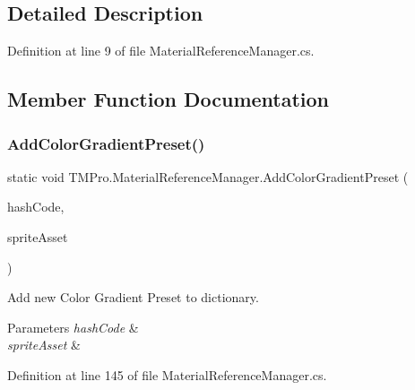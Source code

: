 \subsection{Detailed Description}


Definition at line 9 of file Material\+Reference\+Manager.\+cs.



\subsection{Member Function Documentation}
\mbox{\label{class_t_m_pro_1_1_material_reference_manager_aaff4d63fa8a94aa0b4badb98076ce0b3}} 
\subsubsection{\texorpdfstring{AddColorGradientPreset()}{AddColorGradientPreset()}}
{\footnotesize\ttfamily static void T\+M\+Pro.\+Material\+Reference\+Manager.\+Add\+Color\+Gradient\+Preset (\begin{DoxyParamCaption}\item[{int}]{hash\+Code,  }\item[{\mbox{\hyperlink{class_t_m_pro_1_1_t_m_p___color_gradient}{T\+M\+P\+\_\+\+Color\+Gradient}}}]{sprite\+Asset }\end{DoxyParamCaption})\hspace{0.3cm}{\ttfamily [static]}}



Add new Color Gradient Preset to dictionary. 


\begin{DoxyParams}{Parameters}
{\em hash\+Code} & \\
\hline
{\em sprite\+Asset} & \\
\hline
\end{DoxyParams}


Definition at line 145 of file Material\+Reference\+Manager.\+cs.

\mbox{\label{class_t_m_pro_1_1_material_reference_manager_aef7197e07d5b322b6ed3d8baf4d8c0cf}} 
